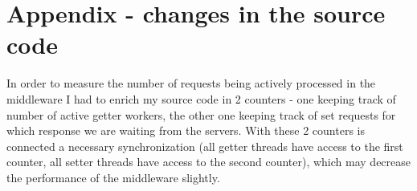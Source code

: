 \documentclass[11pt]{article}
\begin{document}
\pagebreak

\section*{Appendix - changes in the source code}

In order to measure the number of requests being actively processed in the middleware I had to enrich my source code in 2 counters - one keeping track of number of active getter workers, the other one keeping track of set requests for which response we are waiting from the servers. With these 2 counters is connected a necessary synchronization (all getter threads have access to the first counter, all setter threads have access to the second counter), which may decrease the performance of the middleware slightly.

\end{document}
